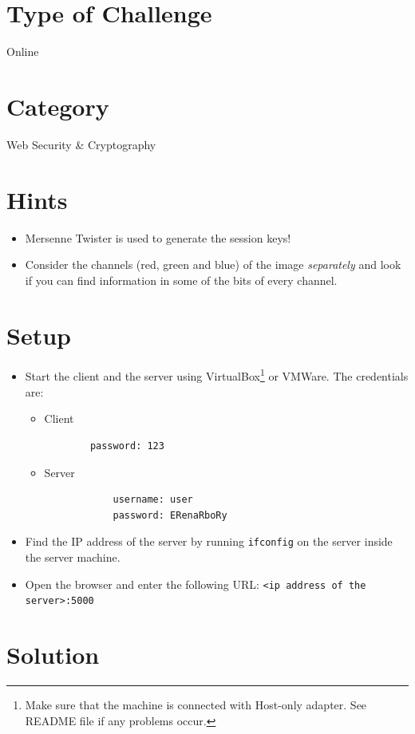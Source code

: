 \documentclass[11pt]{article}
\begin{document}
\section{Type of Challenge}
Online

\section{Category}
Web Security \& Cryptography

\section{Hints}
\begin{itemize}
\item Mersenne Twister is used to generate the session keys!
\item Consider the channels (red, green and blue) of the image \textit{separately} and look if you can find information in some of the bits of every channel. 
\end{itemize}

\section{Setup}
\begin{itemize}
\item Start the client and the server using VirtualBox\footnote{Make sure that the machine is connected with Host-only adapter. See README file if any problems occur.} or VMWare. The credentials are:
\begin{itemize}
	\item Client
	\begin{verbatim}
		password: 123
	\end{verbatim}
	\item Server
		\begin{verbatim}
			username: user
			password: ERenaRboRy
		\end{verbatim}
\end{itemize}
\item Find the IP address of the server by running \texttt{ifconfig} on the server inside the server machine.
\item Open the browser and enter the following URL: \texttt{<ip address of the server>:5000}
\end{itemize}


\section{Solution}
\end{document}
